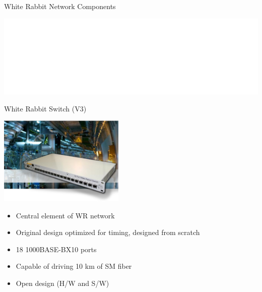 \documentclass[compress,red]{beamer}
\begin{document}
\subsection{}
\begin{frame}{White Rabbit Network Components}


    \begin{center}
    \includegraphics<1>[width=1.0\textwidth]{../../figures/network/WRnetwork-eva.pdf}  %
    \end{center}

\end{frame}
\begin{frame}{White Rabbit Switch (V3)}

    \begin{center}
     \includegraphics[width=6.0cm]{../../figures/switch/wrSwitchV3.jpg}
    \end{center}

	\begin{itemize}
	\item Central element of WR network
	\item Original design optimized for timing, designed from scratch
	\item 18 1000BASE-BX10 ports
	\item Capable of driving 10 km of SM fiber
	\item Open design (H/W and S/W)
	\end{itemize}

\end{frame}
\end{document}
